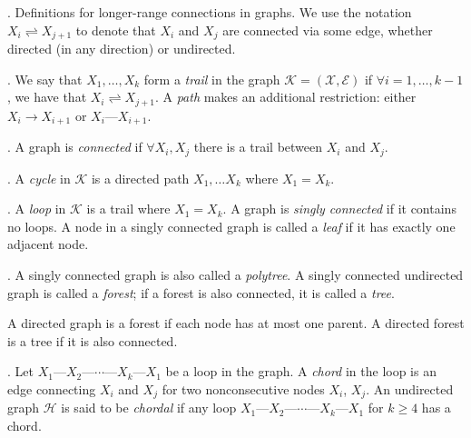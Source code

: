 \documentclass[11pt]{article}
\begin{document}
\myspace
\p {}. Definitions for longer-range connections in graphs. We use the notation $X_i \rightleftharpoons X_{j+1}$ to denote that $X_i$ and $X_j$ are connected via some edge, whether directed (in any direction) or undirected. 
\begin{compactitem}
	\item {}. We say that $X_1, \ldots, X_k$ form a \textit{trail} in the graph $\mathcal K = (\mathcal X, \mathcal E)$ if $\forall i = 1, \ldots, k - 1$, we have that $X_i \rightleftharpoons X_{j + 1}$. A \textit{path} makes an additional restriction: either $X_i \rightarrow X_{i + 1}$ or $X_i \text{---} X_{i + 1}$.
	
	\item {}. A graph is \textit{connected} if $\forall X_i, X_j$ there is a trail between $X_i$ and $X_j$. 
	
	\item {}. A \textit{cycle} in $\mathcal K$ is a directed path $X_1, \ldots X_k$ where $X_1 = X_k$. 
	
	\item {}. A \textit{loop} in $\mathcal K$ is a trail where $X_1 = X_k$. A graph is \textit{singly connected} if it contains no loops. A node in a singly connected graph is called a \textit{leaf} if it has exactly one adjacent node. 
	
	\item {}. A singly connected graph is also called a \textit{polytree}. A singly connected undirected graph is called a \textit{forest}; if a forest is also connected, it is called a \textit{tree}.
	\begin{compactitem}
		\item A directed graph is a forest if each node has at most one parent. A directed forest is a tree if it is also connected.
	\end{compactitem} 
	
	\item {}. Let $X_1 \text{---} X_2 \text{---} \cdots \text{---} X_k \text{---} X_1$ be a loop in the graph. A \textit{chord} in the loop is an edge connecting $X_i$ and $X_j$ for two nonconsecutive nodes $X_i$, $X_j$. An undirected graph $\mathcal H$ is said to be \textit{chordal} if any loop $X_1 \text{---} X_2 \text{---} \cdots \text{---} X_k \text{---} X_1$ for $k \ge 4$ has a chord. 
\end{compactitem}
\end{document}
